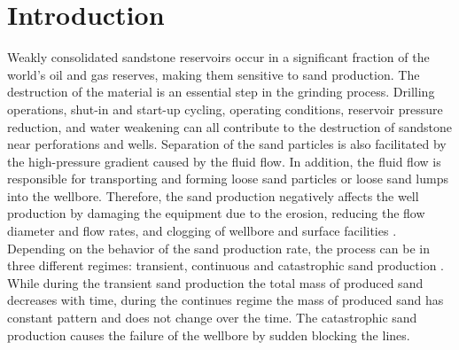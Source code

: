 \documentclass{article}
\begin{document}
\begin{abstract}
    
        
    
\end{abstract}




\section{Introduction}
Weakly consolidated sandstone reservoirs occur in a significant fraction of the world's oil and gas reserves, making them sensitive to sand production. The destruction of the material is an essential step in the grinding process. Drilling operations, shut-in and start-up cycling, operating conditions, reservoir pressure reduction, and water weakening can all contribute to the destruction of sandstone near perforations and wells. Separation of the sand particles is also facilitated by the high-pressure gradient caused by the fluid flow. In addition, the fluid flow is responsible for transporting and forming loose sand particles or loose sand lumps into the wellbore. Therefore, the sand production negatively affects the well production by damaging the equipment due to the erosion, reducing the flow diameter and flow rates, and clogging of wellbore and surface facilities \citep{rahmati2013review}. Depending on the behavior of the sand production rate, the process can be in three different regimes: transient, continuous and catastrophic sand production \citep{veeken1991sand}. While during the transient sand production the total mass of produced sand decreases with time, during the continues regime the mass of produced sand has constant pattern and does not change over the time. The catastrophic sand production causes the failure of the wellbore by sudden blocking the lines.
\end{document}

